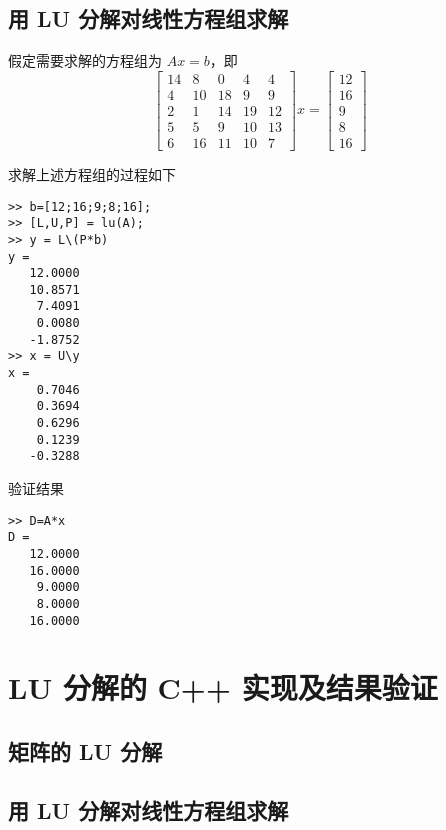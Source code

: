 \subsection{用 LU 分解对线性方程组求解}
假定需要求解的方程组为 $Ax=b$，即
\begin{equation}
    \begin{bmatrix}
        14 & 8  & 0  & 4  & 4  \\
        4  & 10 & 18 & 9  & 9  \\
        2  & 1  & 14 & 19 & 12 \\
        5  & 5  & 9  & 10 & 13 \\
        6  & 16 & 11 & 10 & 7
    \end{bmatrix}
    x = 
    \begin{bmatrix}
        12 \\ 16 \\ 9 \\ 8 \\ 16
    \end{bmatrix}
\end{equation}

求解上述方程组的过程如下
\begin{lstlisting}
>> b=[12;16;9;8;16];
>> [L,U,P] = lu(A);
>> y = L\(P*b)
y =
   12.0000
   10.8571
    7.4091
    0.0080
   -1.8752
>> x = U\y
x =
    0.7046
    0.3694
    0.6296
    0.1239
   -0.3288
\end{lstlisting}

验证结果
\begin{lstlisting}
>> D=A*x
D =
   12.0000
   16.0000
    9.0000
    8.0000
   16.0000
\end{lstlisting}


\section{LU 分解的 C++ 实现及结果验证}
\subsection{矩阵的 LU 分解}
\subsection{用 LU 分解对线性方程组求解}